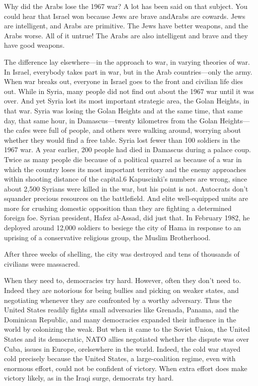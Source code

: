 \documentclass[10pt]{article}
\begin{document}
{\large Why did the Arabs lose the 1967 war? A lot has been said on that
subject. You could hear that Israel won because Jews are brave andArabs are
cowards. Jews are intelligent, and Arabs are primitive. The Jews have better
weapons, and the Arabs worse. All of it untrue! The Arabs are also intelligent
and brave and they have good weapons.}

{\large The difference lay elsewhere---in the approach to war, in varying
theories of war. In Israel, everybody takes part in war, but in the Arab
countries---only the army. When war breaks out, everyone in Israel goes to the
front and civilian life dies out. While in Syria, many people did not find out
about the 1967 war until it was over. And yet Syria lost its most important
strategic area, the Golan Heights, in that war. Syria was losing the Golan
Heights and at the same time, that same day, that same hour, in Damascus---twenty
kilometres from the Golan Heights---the cafes were full of people, and others
were walking around, worrying about whether they would find a free table. Syria
lost fewer than 100 soldiers in the 1967 war. A year earlier, 200 people had died
in Damascus during a palace coup. Twice as many people die because of a political
quarrel as because of a war in which the country loses its most important
territory and the enemy approaches within shooting distance of the capital.6
Kapuscinki's numbers are wrong, since about 2,500 Syrians were killed in the war,
but his point is not. Autocrats don't squander precious resources on the
battlefield. And elite well-equipped units are more for crushing domestic
opposition than they are fighting a determined foreign foe. Syrian president,
Hafez al-Assad, did just that. In February 1982, he deployed around 12,000
soldiers to besiege the city of Hama in response to an uprising of a conservative
religious group, the Muslim Brotherhood.}

{\large After three weeks of shelling, the city was destroyed and tens of
thousands of civilians were massacred.}

{\large When they need to, democracies try hard. However, often they don't need
to. Indeed they are notorious for being bullies and picking on weaker states, and
negotiating whenever they are confronted by a worthy adversary. Thus the United
States readily fights small adversaries like Grenada, Panama, and the Dominican
Republic, and many democracies expanded their influence in the world by
colonizing the weak. But when it came to the Soviet Union, the United States and
its democratic, NATO allies negotiated whether the dispute was over Cuba, issues
in Europe, orelsewhere in the world. Indeed, the cold war stayed cold precisely
because the United States, a large-coalition regime, even with enormous effort,
could not be confident of victory. When extra effort does make victory likely, as
in the Iraqi surge, democrats try hard.}
\end{document}
